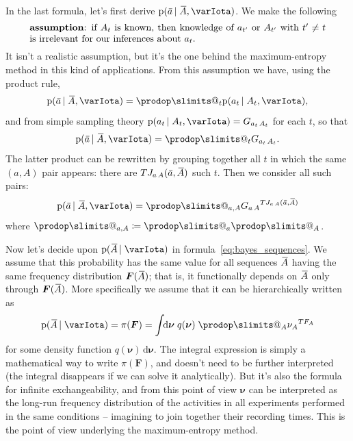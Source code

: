 \documentclass[\ifafour a4paper,12pt,\else a5paper,10pt,\fi%
onecolumn,oneside,article,%
british%
]{memoir}
\makeatletter
\theoremstyle{remark}
\theoremstyle{innote}
\def\prod{\DOTSI\prodop\slimits@}
\newcommand*{\di}{\mathrm{d}}%
\newcommand*{\defd}{\coloneqq}
\newcommand*{\pf}{\mathrm{p}}%
\renewcommand*{\|}[1][]{\nonscript\,#1\vert\nonscript\;\mathopen{}}
\newcommand*{\widebar}[1]{{\mkern1.5mu\skew{2}\overline{\mkern-1.5mu#1\mkern-1.5mu}\mkern 1.5mu}}
\newcommand*{\yFF}{F}
\newcommand*{\yF}{\bm{\yFF}}
\newcommand*{\yAs}{\widebar{A}}%
\newcommand*{\yas}{\widebar{a}}%
\newcommand*{\ynuu}{\nu}
\newcommand*{\ynu}{\bm{\ynuu}}
\newcommand*{\yI}{\varIota}
\makeatother
\begin{document}
In the last formula, let's first derive $\pf(\yas \| \yAs, \yI)$. We make
the following
\begin{equation}
  \label{eq:assumption_irrelevance_t}
  \parbox{0.9\linewidth}{\textbf{assumption}: if $A_{t}$ is known, then
    knowledge of $a_{t'}$ or $A_{t'}$ with $t'\ne t$ is irrelevant for our
    inferences about $a_{t}$.}  
\end{equation}
It isn't a realistic assumption, but it's the one behind the
maximum-entropy method in this kind of applications. From this assumption
we have, using the product rule,
\begin{equation}
  \label{eq:factor_at_At}
  \pf(\yas \| \yAs, \yI) = \prod_{t} \pf(a_{t} \| A_{t}, \yI),
\end{equation}
and from simple sampling theory
$\pf(a_{t} \| A_{t}, \yI) = G_{a_{t}\,A_{t}}$ for each $t$, so that
\begin{equation}
  \label{eq:factor_at_At}
  \pf(\yas \| \yAs, \yI) = \prod_{t} G_{a_{t}\,A_{t}}.
\end{equation}
The latter product can be rewritten by grouping together all $t$ in which
the same $(a,A)$ pair appears: there are $T J_{a\,A}(\yas,\yAs)$ such $t$.
Then we consider all such pairs:
\begin{equation}
  \label{eq:factor_at_At_grouped}
  \pf(\yas \| \yAs, \yI) = \prod_{a,A} {G_{a\,A}}^{T J_{a\,A}(\yas,\yAs)}
\end{equation}
where $\prod_{a,A} \defd \prod_{a}\prod_{A}$.

\medskip

Now let's decide upon $\pf(\yAs \| \yI)$ in
formula~\eqref{eq:bayes_sequences}. We assume that this probability has the
same value for all sequences $\yAs$ having the same frequency distribution
$\yF(\yAs)$; that is, it functionally depends on $\yAs$ only through
$\yF(\yAs)$. More specifically we assume that it can be hierarchically
written as
\begin{equation}
  \label{eq:p_as_exchangeable}
  \pf(\yAs \| \yI) = \pi(\yF) =
  \int\!\!\di\ynu\;q(\ynu)\;\prod_{A}{\nu_{A}}^{T F_{A}}
\end{equation}
for some density function $q(\ynu)\,\di\ynu$. The integral expression is
simply a mathematical way to write $\pi(\yF)$, and doesn't need to be
further interpreted (the integral disappears if we can solve it
analytically). But it's also the formula for infinite exchangeability, and
from this point of view $\ynu$ can be interpreted as the long-run frequency
distribution of the activities in all experiments performed in the same
conditions -- imagining to join together their recording times. This is the
point of view underlying the maximum-entropy method.
\end{document}
